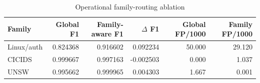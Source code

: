 \begin{table}[t]
\caption{Operational family-routing ablation}
\label{tab:operational_ablation_full}
\centering
\scriptsize
\begin{tabular}{l r r r r r}
\toprule
\textbf{Family} & \textbf{Global F1} & \textbf{Family-aware F1} & \textbf{$\Delta$ F1} & \textbf{Global FP/1000} & \textbf{Family FP/1000} \\
\midrule
Linux/auth & 0.824368 & 0.916602 & 0.092234 & 50.000 & 29.120 \\
CICIDS & 0.999667 & 0.997163 & -0.002503 & 0.000 & 1.037 \\
UNSW & 0.995662 & 0.999965 & 0.004303 & 1.667 & 0.001 \\
\bottomrule
\end{tabular}
\end{table}
